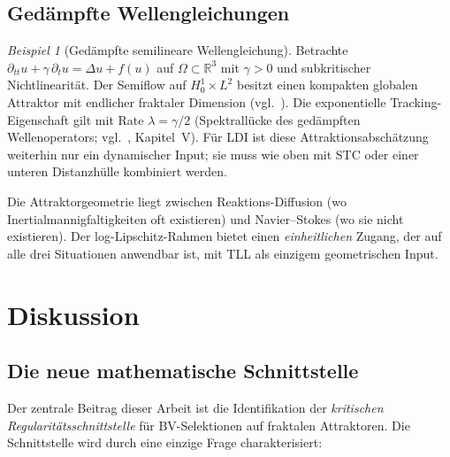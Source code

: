 \documentclass[12pt,a4paper]{article}
\theoremstyle{definition}
\theoremstyle{plain}
\theoremstyle{remark}
\newtheorem{example}[definition]{Beispiel}
\begin{document}
\subsection{Gedämpfte Wellengleichungen}

\begin{example}[Gedämpfte semilineare Wellengleichung]
\label{ex:wave}
Betrachte $\partial_{tt} u + \gamma\,\partial_t u = \Delta u + f(u)$
auf $\Omega \subset \mathbb{R}^3$ mit $\gamma > 0$ und subkritischer
Nichtlinearität.  Der Semiflow auf $H^1_0 \times L^2$ besitzt einen
kompakten globalen Attraktor mit endlicher fraktaler Dimension
(vgl.~\cite{BabinVishik1992}).  Die exponentielle Tracking-Eigenschaft
gilt mit Rate $\lambda = \gamma/2$ (Spektrallücke des gedämpften
Wellenoperators; vgl.~\cite{BabinVishik1992}, Kapitel~V).  Für LDI
ist diese Attraktionsabschätzung weiterhin nur ein dynamischer Input;
sie muss wie oben mit STC oder einer unteren Distanzhülle kombiniert
werden.

Die Attraktorgeometrie liegt zwischen Reaktions-Diffusion
(wo Inertialmannigfaltigkeiten oft existieren) und Navier--Stokes
(wo sie nicht existieren).  Der log-Lipschitz-Rahmen bietet einen
\emph{einheitlichen} Zugang, der auf alle drei Situationen
anwendbar ist, mit TLL als einzigem geometrischen Input.
\end{example}


\section{Diskussion}
\label{sec:discussion}

\subsection{Die neue mathematische Schnittstelle}

Der zentrale Beitrag dieser Arbeit ist die Identifikation der
\emph{kritischen Regularitätsschnittstelle} für BV-Selektionen
auf fraktalen Attraktoren.  Die Schnittstelle wird durch eine
einzige Frage charakterisiert:

\begin{center}
\end{center}
\end{document}
